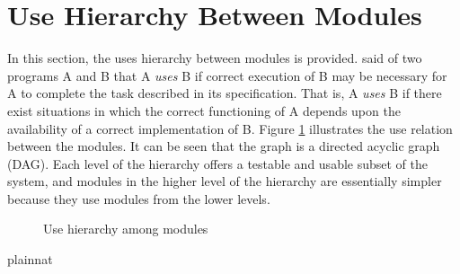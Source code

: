 \documentclass[12pt, titlepage]{article}
\begin{document}
\section{Use Hierarchy Between Modules} \label{SecUse}

In this section, the uses hierarchy between modules is
provided. \citet{Parnas1978} said of two programs A and B that A {\em uses} B if
correct execution of B may be necessary for A to complete the task described in
its specification. That is, A {\em uses} B if there exist situations in which
the correct functioning of A depends upon the availability of a correct
implementation of B.  Figure \ref{FigUH} illustrates the use relation between
the modules. It can be seen that the graph is a directed acyclic graph
(DAG). Each level of the hierarchy offers a testable and usable subset of the
system, and modules in the higher level of the hierarchy are essentially simpler
because they use modules from the lower levels.

\begin{figure}[H]
\centering
\caption{Use hierarchy among modules}
\label{FigUH}
\end{figure}


 {plainnat}


\newpage{}
\end{document}

